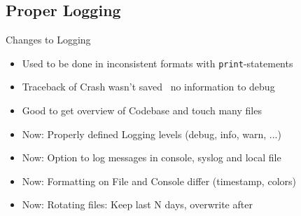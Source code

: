\subsection{Proper Logging}

\begin{frame}[c]{Changes to Logging}
    \large
    \begin{itemize}[<+(1)->]
        \item Used to be done in inconsistent formats with \texttt{print}-statements
        \item Traceback of Crash wasn't saved \MVRightarrow\ no information to debug
        \item Good to get overview of Codebase and touch many files
        \item Now: Properly defined Logging levels (debug, info, warn, ...)
        \item Now: Option to log messages in console, syslog and local file
        \item Now: Formatting on File and Console differ (timestamp, colors)
        \item Now: Rotating files: Keep last N days, overwrite after
    \end{itemize}
\end{frame}

